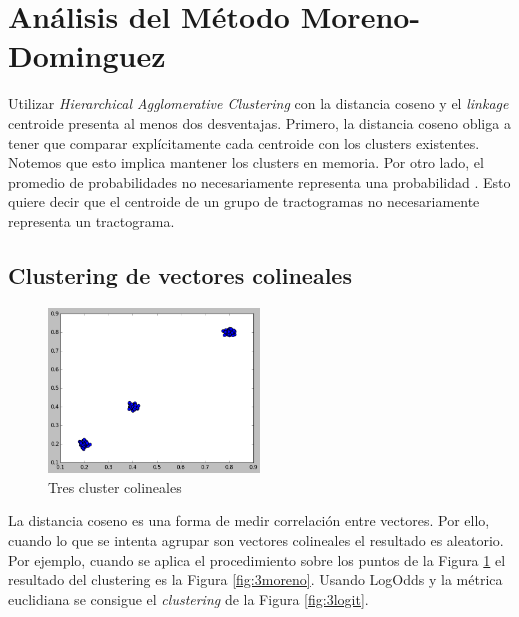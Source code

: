 \section{An\'alisis del M\'etodo Moreno-Dominguez}

Utilizar \textit{Hierarchical Agglomerative Clustering} con la distancia 
coseno y el \textit{linkage} centroide presenta al menos dos desventajas. 
Primero, la distancia coseno obliga a tener que comparar expl\'icitamente cada
centroide con los clusters existentes. Notemos que esto implica mantener los
clusters en memoria. Por otro lado, el promedio de probabilidades no
necesariamente representa una probabilidad \cite{Pohl2007}. Esto quiere decir
que el centroide de un grupo de tractogramas no necesariamente representa un
tractograma. \\

\subsection{Clustering de vectores colineales}

\begin{figure}[h!]
        \centering
        \includegraphics[width=0.5\textwidth]{img/3pop.png}
        \caption{Tres cluster colineales\-}
        \label{fig:3clusters}
\end{figure}

La distancia coseno es una forma de medir co\-rrelaci\'on entre vectores. Por ello,
cuando lo que se intenta agrupar son vectores colineales el resultado es aleatorio.
Por ejemplo, cuando se aplica el procedimiento sobre los puntos de la Figura
\ref{fig:3clusters} el resultado del clustering es la Figura \ref{fig:3moreno}.
Usando LogOdds y la m\'etrica euclidiana se consigue el \textit{clustering} de 
la Figura \ref{fig:3logit}.\\

